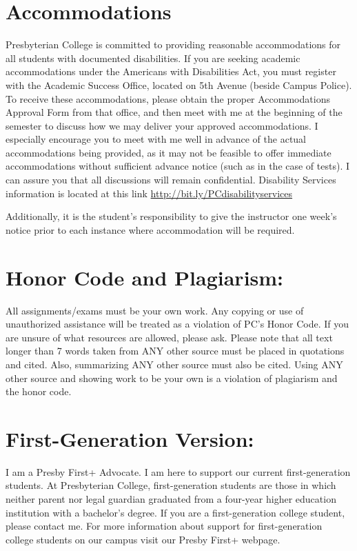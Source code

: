 \documentclass[
]{book}
\theoremstyle{definition}
\theoremstyle{definition}
\theoremstyle{definition}
\theoremstyle{definition}
\theoremstyle{remark}
\begin{document}
\hypertarget{accommodations}{%
\section{Accommodations}\label{accommodations}}

Presbyterian College is committed to providing reasonable accommodations for all students with documented disabilities. If you are seeking academic accommodations under the Americans with Disabilities Act, you must register with the Academic Success Office, located on 5th Avenue (beside Campus Police). To receive these accommodations, please obtain the proper Accommodations Approval Form from that office, and then meet with me at the beginning of the semester to discuss how we may deliver your approved accommodations. I especially encourage you to meet with me well in advance of the actual accommodations being provided, as it may not be feasible to offer immediate accommodations without sufficient advance notice (such as in the case of tests). I can assure you that all discussions will remain confidential. Disability Services information is located at this link \url{http://bit.ly/PCdisabilityservices}

Additionally, it is the student's responsibility to give the instructor one week's notice prior to each instance where accommodation will be required.

\hypertarget{honor-code-and-plagiarism}{%
\section{Honor Code and Plagiarism:}\label{honor-code-and-plagiarism}}

All assignments/exams must be your own work. Any copying or use of unauthorized assistance will be treated as a violation of PC's Honor Code. If you are unsure of what resources are allowed, please ask. Please note that all text longer than 7 words taken from ANY other source must be placed in quotations and cited. Also, summarizing ANY other source must also be cited. Using ANY other source and showing work to be your own is a violation of plagiarism and the honor code.

\hypertarget{first-generation-version}{%
\section{First-Generation Version:}\label{first-generation-version}}

I am a Presby First+ Advocate. I am here to support our current first-generation students. At Presbyterian College, first-generation students are those in which neither parent nor legal guardian graduated from a four-year higher education institution with a bachelor's degree. If you are a first-generation college student, please contact me. For more information about support for first-generation college students on our campus visit our Presby First+ webpage.
\end{document}
